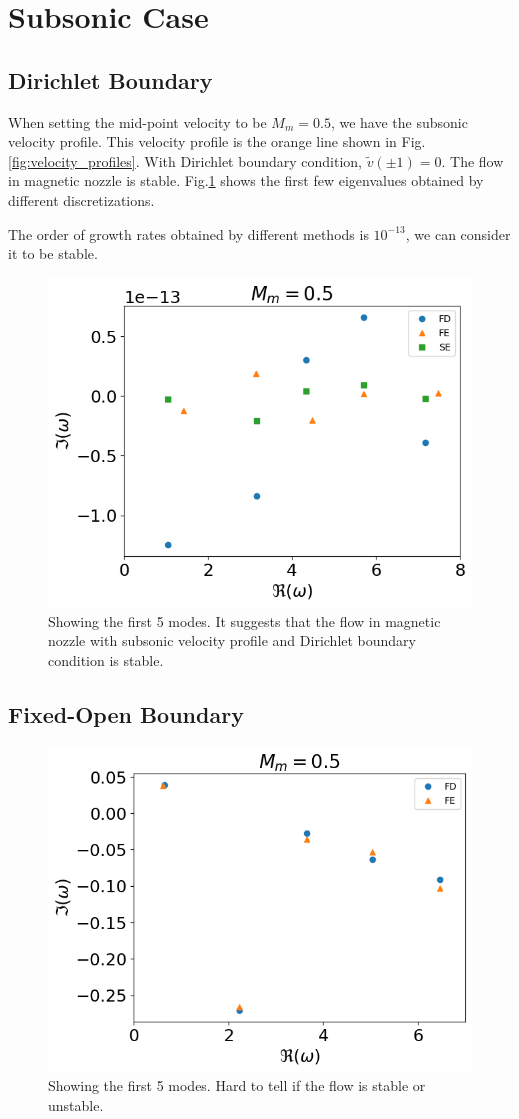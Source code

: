 \section{Subsonic Case}
\subsection{Dirichlet Boundary}
When setting the mid-point velocity to be $M_m=0.5$, we have the subsonic velocity profile. This velocity profile is the orange line shown in Fig.\ref{fig:velocity_profiles}. With Dirichlet boundary condition, $\tilde{v}(\pm 1) =0$. The flow in magnetic nozzle is stable. Fig.\ref{fig:subsonic_v_dirichlet} shows the first few eigenvalues obtained by different discretizations. 

The order of growth rates obtained by different methods is $10^{-13}$, we can consider it to be stable.
\begin{figure} [H]
	\centering
	\includegraphics[width=0.7\linewidth]{img/numerical_experiments/fixed_fixed/subsonic_v}
	\caption{Showing the first 5 modes. It suggests that the flow in magnetic nozzle with subsonic velocity profile and Dirichlet boundary condition is stable.}
	\label{fig:subsonic_v_dirichlet}
\end{figure}

\subsection{Fixed-Open Boundary}
\begin{figure} [H]
	\centering
	\includegraphics[width=0.7\linewidth]{img/numerical_experiments/fixed_open/subsonic_v}
	\caption{Showing the first 5 modes. Hard to tell if the flow is stable or unstable.}
	\label{fig:subsonic_v_fixed_open}
\end{figure}


